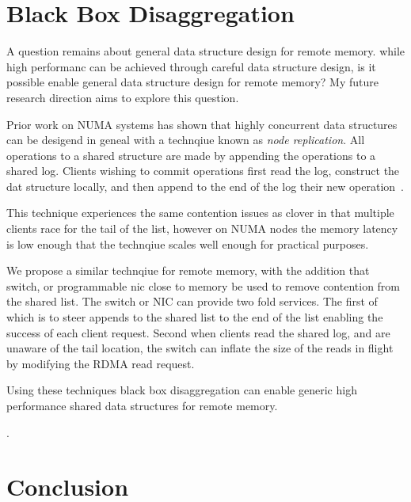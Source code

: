 \section{Black Box Disaggregation}

A question remains about general data structure design for
remote memory. while high performanc can be achieved through
careful data structure design, is it possible enable general
data structure design for remote memory? My future research
direction aims to explore this question.

Prior work on NUMA systems has shown that highly concurrent
data structures can be desigend in geneal with a technqiue
known as \textit{node replication}. All operations to a
shared structure are made by appending the operations to a
shared log. Clients wishing to commit operations first read
the log, construct the dat structure locally, and then
append to the end of the log their new operation~\cite{bbd}.

This technique experiences the same contention issues as
clover in that multiple clients race for the tail of the
list, however on NUMA nodes the memory latency is low enough
that the technqiue scales well enough for practical
purposes. 

We propose a similar technqiue for remote memory, with the
addition that switch, or programmable nic close to memory be
used to remove contention from the shared list. The switch
or NIC can provide two fold services. The first of which is
to steer appends to the shared list to the end of the list
enabling the success of each client request. Second when
clients read the shared log, and are unaware of the tail
location, the switch can inflate the size of the reads in
flight by modifying the RDMA read request. 

Using these techniques black box disaggregation can enable
generic high performance shared data structures for remote
memory.

.

\section{Conclusion}
